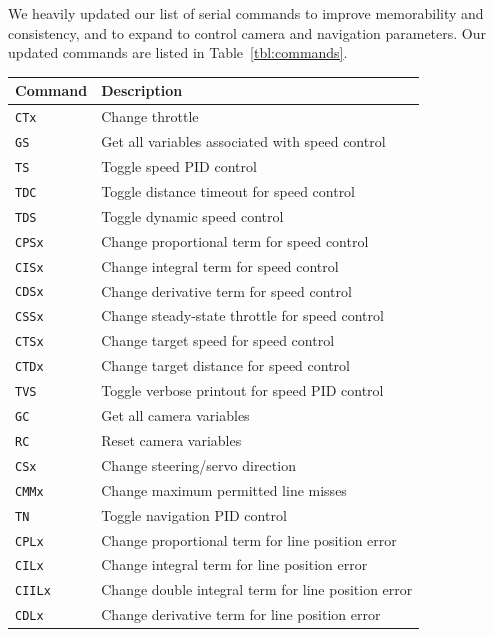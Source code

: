 \documentclass[letterpaper, 11pt]{article}
\begin{document}
\begin{enumerate}[label=\textbf{\arabic*.}]
We heavily updated our list of serial commands to improve memorability and consistency, and to expand to control camera and navigation parameters. Our updated commands are listed in Table~\ref{tbl:commands}.
\begin{table}[ht]
    \centering
    \begin{tabular}{@{}ll@{}}
        \toprule
        \textbf{Command} & \textbf{Description} \\ \midrule
        \texttt{CTx} & Change throttle \\
        \texttt{GS} & Get all variables associated with speed control \\
        \texttt{TS} & Toggle speed PID control \\
        \texttt{TDC} & Toggle distance timeout for speed control \\
        \texttt{TDS} & Toggle dynamic speed control \\
        \texttt{CPSx} & Change proportional term for speed control \\
        \texttt{CISx} & Change integral term for speed control \\
        \texttt{CDSx} & Change derivative term for speed control \\
        \texttt{CSSx} & Change steady-state throttle for speed control \\
        \texttt{CTSx} & Change target speed for speed control \\
        \texttt{CTDx} & Change target distance for speed control \\
        \texttt{TVS} & Toggle verbose printout for speed PID control \\ \midrule
        \texttt{GC} & Get all camera variables \\
        \texttt{RC} & Reset camera variables \\
        \texttt{CSx} & Change steering/servo direction \\
        \texttt{CMMx} & Change maximum permitted line misses \\ \midrule
        \texttt{TN} & Toggle navigation PID control \\
        \texttt{CPLx} & Change proportional term for line position error \\
        \texttt{CILx} & Change integral term for line position error \\
        \texttt{CIILx} & Change double integral term for line position error \\
        \texttt{CDLx} & Change derivative term for line position error \\

\end{tabular}
\end{table}
\end{enumerate}
\end{document}
